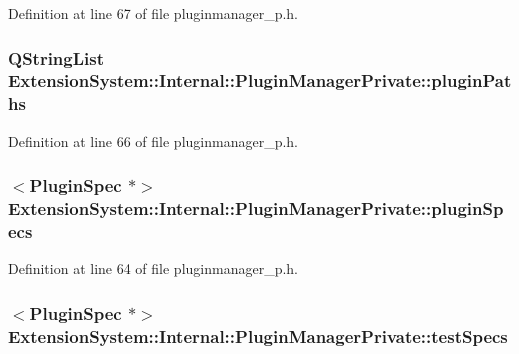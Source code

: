 Definition at line 67 of file pluginmanager\-\_\-p.\-h.

\hypertarget{class_extension_system_1_1_internal_1_1_plugin_manager_private_aab8385c194dea0ca7100ace14cd9ce29}{
\subsubsection[{plugin\-Paths}]{\setlength{\rightskip}{0pt plus 5cm}Q\-String\-List Extension\-System\-::\-Internal\-::\-Plugin\-Manager\-Private\-::plugin\-Paths}}\label{class_extension_system_1_1_internal_1_1_plugin_manager_private_aab8385c194dea0ca7100ace14cd9ce29}


Definition at line 66 of file pluginmanager\-\_\-p.\-h.

\hypertarget{class_extension_system_1_1_internal_1_1_plugin_manager_private_a1654aed9c8c9d015cc3ef398f405613e}{
\subsubsection[{plugin\-Specs}]{$<${\bf Plugin\-Spec} $\ast$$>$ Extension\-System\-::\-Internal\-::\-Plugin\-Manager\-Private\-::plugin\-Specs}}\label{class_extension_system_1_1_internal_1_1_plugin_manager_private_a1654aed9c8c9d015cc3ef398f405613e}


Definition at line 64 of file pluginmanager\-\_\-p.\-h.

\hypertarget{class_extension_system_1_1_internal_1_1_plugin_manager_private_a25ce55fe8bc3538c6fe2c5ac18be1f66}{
\subsubsection[{test\-Specs}]{$<${\bf Plugin\-Spec} $\ast$$>$ Extension\-System\-::\-Internal\-::\-Plugin\-Manager\-Private\-::test\-Specs}}\label{class_extension_system_1_1_internal_1_1_plugin_manager_private_a25ce55fe8bc3538c6fe2c5ac18be1f66}


